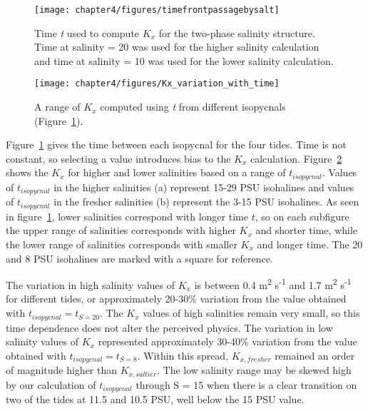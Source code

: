 \begin{figure}
\centering
	\texttt{[image: chapter4/figures/timefrontpassagebysalt]}
	\caption{Time \emph{t} used to compute $K_x$ for the two-phase salinity structure. Time at salinity = 20 was used for the higher salinity calculation and time at salinity = 10 was used for the lower salinity calculation.}  \label{fig:tvsS}
\end{figure}



\begin{figure}
\centering
	\texttt{[image: chapter4/figures/Kx\_variation\_with\_time]}
	\caption{A range of $K_x$ computed using \emph{t} from different isopycnals (Figure~\ref{fig:tvsS}).}  \label{fig:Kxvst}
\end{figure}



Figure~\ref{fig:tvsS} gives the time between each isopycnal for the four tides. Time is not constant, so selecting a value introduces bias to the $K_x$ calculation. Figure~\ref{fig:Kxvst} shows the $K_x$ for higher and lower salinities based on a range of $t_{isopycnal}$. Values of $t_{isopycnal}$ in the higher salinities (a) represent 15-29 PSU isohalines and values of $t_{isopycnal}$ in the fresher salinities (b) represent the 3-15 PSU isohalines. As seen in figure~\ref{fig:tvsS}, lower salinities correspond with longer time $t$, so on each subfigure the upper range of salinities corresponds with higher $K_x$ and shorter time, while the lower range of salinities corresponds with smaller $K_x$ and longer time. The 20 and 8 PSU isohalines are marked with a square for reference.

The variation in high salinity values of $K_x$ is between 0.4 m\textsuperscript{2} s\textsuperscript{-1} and 1.7 m\textsuperscript{2} s\textsuperscript{-1} for different tides, or approximately 20-30\% variation from the value obtained with $t_{isopycnal}=t_{S=20}$. The $K_x$ values of high salinities remain very small, so this time dependence does not alter the perceived physics. The variation in low salinity values of $K_x$ represented approximately 30-40\% variation from the value obtained with $t_{isopycnal}=t_{S=8}$. Within this spread, $K_{x,fresher}$ remained an order of magnitude higher than $K_{x,saltier}$. The low salinity range may be skewed high by our calculation of $t_{isopycnal}$ through S = 15 when there is a clear transition on two of the tides at 11.5 and 10.5 PSU, well below the 15 PSU value. 

